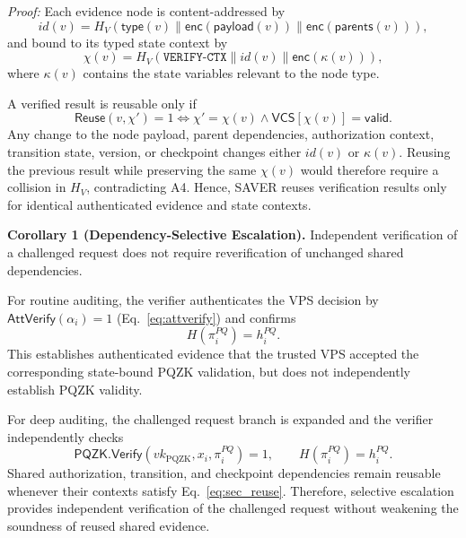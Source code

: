 \documentclass[lettersize,journal]{IEEEtran}
\begin{document}
\emph{Proof:}
Each evidence node is content-addressed by
\begin{equation}
id(v)=
H_V(\mathsf{type}(v)\parallel
\mathsf{enc}(\mathsf{payload}(v))\parallel
\mathsf{enc}(\mathsf{parents}(v))),
\end{equation}
and bound to its typed state context by
\begin{equation}
\chi(v)=
H_V(\texttt{VERIFY-CTX}\parallel
id(v)\parallel\mathsf{enc}(\kappa(v))),
\label{eq:sec_saver_ctx}
\end{equation}
where $\kappa(v)$ contains the state variables relevant to the node
type.

A verified result is reusable only if
\begin{equation}
\mathsf{Reuse}(v,\chi')=1
\Longleftrightarrow
\chi'=\chi(v)
\land
\mathsf{VCS}[\chi(v)]=\mathsf{valid}.
\label{eq:sec_reuse}
\end{equation}
Any change to the node payload, parent dependencies, authorization
context, transition state, version, or checkpoint changes either
$id(v)$ or $\kappa(v)$. Reusing the previous result while preserving
the same $\chi(v)$ would therefore require a collision in $H_V$,
contradicting A4. Hence, SAVER reuses verification results only for
identical authenticated evidence and state contexts.

\medskip
\noindent\textbf{Corollary 1 (Dependency-Selective Escalation).}
Independent verification of a challenged request does not require
reverification of unchanged shared dependencies.

For routine auditing, the verifier authenticates the VPS decision by
\textcolor{e2}{$\mathsf{AttVerify}(\alpha_i)=1$
(Eq.~\eqref{eq:attverify})}
and confirms
\begin{equation}
H(\pi_i^{PQ})=h_i^{PQ}.
\end{equation}
This establishes authenticated evidence that the trusted VPS accepted
the corresponding state-bound PQZK validation, but does not
independently establish PQZK validity.

For deep auditing, the challenged request branch is expanded and the
verifier independently checks
\begin{equation}
\mathsf{PQZK.Verify}
(vk_{\mathrm{PQZK}},x_i,\pi_i^{PQ})=1,
\qquad
H(\pi_i^{PQ})=h_i^{PQ}.
\end{equation}
Shared authorization, transition, and checkpoint dependencies remain
reusable whenever their contexts satisfy
Eq.~\eqref{eq:sec_reuse}. Therefore, selective escalation provides
independent verification of the challenged request without weakening
the soundness of reused shared evidence.
\end{document}
